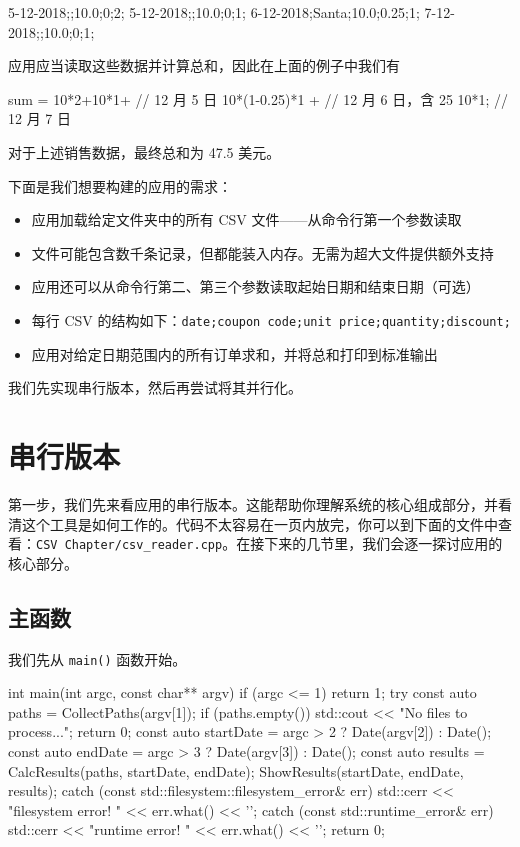 \begin{codebox}[cpp]
5-12-2018;;10.0;0;2;
5-12-2018;;10.0;0;1;
6-12-2018;Santa;10.0;0.25;1;
7-12-2018;;10.0;0;1;
\end{codebox}

应用应当读取这些数据并计算总和，因此在上面的例子中我们有

\begin{codebox}[cpp]
sum = 10*2+10*1+
// 12 月 5 日
10*(1-0.25)*1 +
// 12 月 6 日，含 25%
10*1;
// 12 月 7 日
\end{codebox}

对于上述销售数据，最终总和为 47.5 美元。

下面是我们想要构建的应用的需求：
\begin{itemize}
\item 应用加载给定文件夹中的所有 CSV 文件——从命令行第一个参数读取
\item 文件可能包含数千条记录，但都能装入内存。无需为超大文件提供额外支持
\item 应用还可以从命令行第二、第三个参数读取起始日期和结束日期（可选）
\item 每行 CSV 的结构如下：\texttt{date;coupon code;unit price;quantity;discount;}
\item 应用对给定日期范围内的所有订单求和，并将总和打印到标准输出
\end{itemize}

我们先实现串行版本，然后再尝试将其并行化。

\section{串行版本}

第一步，我们先来看应用的串行版本。这能帮助你理解系统的核心组成部分，并看清这个工具是如何工作的。代码不太容易在一页内放完，你可以到下面的文件中查看：\texttt{CSV Chapter/csv\_reader.cpp}。在接下来的几节里，我们会逐一探讨应用的核心部分。

\subsection{主函数}

我们先从 \texttt{main()} 函数开始。

\begin{codebox}[cpp]
int main(int argc, const char** argv) {
if (argc <= 1)
return 1;
try {
const auto paths = CollectPaths(argv[1]);
if (paths.empty()) {
std::cout << "No files to process...\n";
return 0;
}
const auto startDate = argc > 2 ? Date(argv[2]) : Date();
const auto endDate = argc > 3 ? Date(argv[3]) : Date();
const auto results = CalcResults(paths, startDate, endDate);
ShowResults(startDate, endDate, results);
}
catch (const std::filesystem::filesystem_error& err) {
std::cerr << "filesystem error! " << err.what() << '\n';
}
catch (const std::runtime_error& err) {
std::cerr << "runtime error! " << err.what() << '\n';
}
return 0;
}
\end{codebox}

